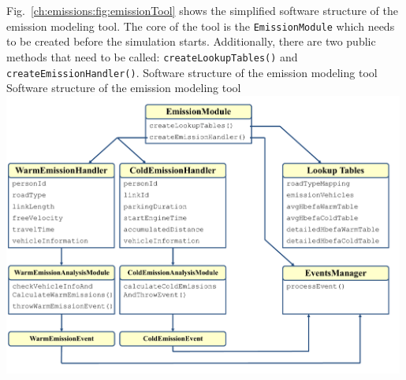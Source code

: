 Fig.~\ref{ch:emissions:fig:emissionTool} shows the simplified software structure of the emission modeling tool. The core of the tool is the \texttt{EmissionModule} which needs to be created before the simulation starts. Additionally, there are two public methods that need to be called: \texttt{createLookupTables()} and \texttt{createEmissionHandler()}.
%
\createfigure%
{Software structure of the emission modeling tool}%
{Software structure of the emission modeling tool}%
{\label{ch:emissions:fig:emissionTool}}%
{\includegraphics[width=0.99\textwidth, angle=0]{extending/figures/emissionToolOverview_pdfa.pdf}}%
{}

